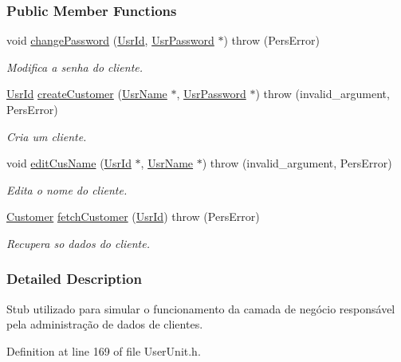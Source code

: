 \subsubsection*{Public Member Functions}
\begin{DoxyCompactItemize}
\item 
void \hyperlink{classStubUserCusAdm_a2786aaadaffac84a859f992159ebecf8}{change\-Password} (\hyperlink{classUsrId}{Usr\-Id}, \hyperlink{classUsrPassword}{Usr\-Password} $\ast$)  throw (\-Pers\-Error)
\begin{DoxyCompactList}\small\item\em Modifica a senha do cliente. \end{DoxyCompactList}\item 
\hyperlink{classUsrId}{Usr\-Id} \hyperlink{classStubUserCusAdm_a6b0c9fc7280045d06bf263d7286b37e9}{create\-Customer} (\hyperlink{classUsrName}{Usr\-Name} $\ast$, \hyperlink{classUsrPassword}{Usr\-Password} $\ast$)  throw (invalid\-\_\-argument, Pers\-Error)
\begin{DoxyCompactList}\small\item\em Cria um cliente. \end{DoxyCompactList}\item 
void \hyperlink{classStubUserCusAdm_a09db6dc02a43ff702efdc2341038df8e}{edit\-Cus\-Name} (\hyperlink{classUsrId}{Usr\-Id} $\ast$, \hyperlink{classUsrName}{Usr\-Name} $\ast$)  throw (invalid\-\_\-argument, Pers\-Error)
\begin{DoxyCompactList}\small\item\em Edita o nome do cliente. \end{DoxyCompactList}\item 
\hyperlink{classCustomer}{Customer} \hyperlink{classStubUserCusAdm_aac14b018a6284211b1c83c48a9529efe}{fetch\-Customer} (\hyperlink{classUsrId}{Usr\-Id})  throw (\-Pers\-Error)
\begin{DoxyCompactList}\small\item\em Recupera so dados do cliente. \end{DoxyCompactList}\end{DoxyCompactItemize}


\subsubsection{Detailed Description}
Stub utilizado para simular o funcionamento da camada de negócio responsável pela administração de dados de clientes. 

Definition at line 169 of file User\-Unit.\-h.



